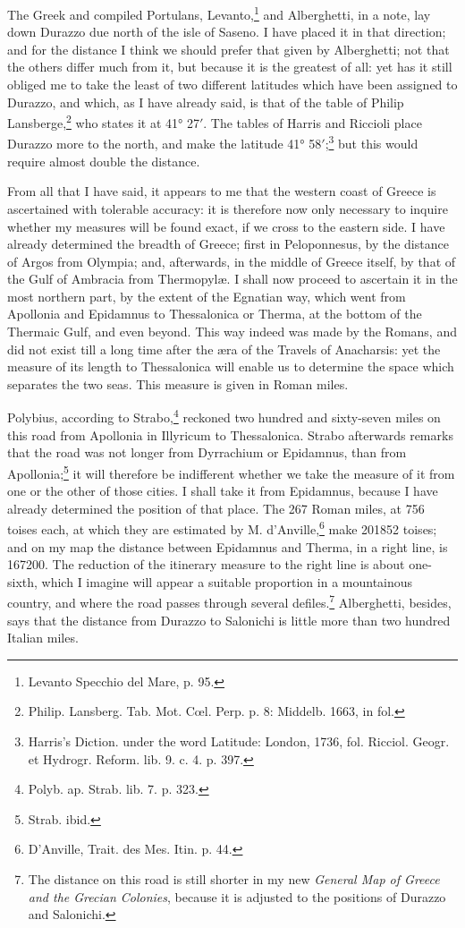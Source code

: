 \documentclass[a4paper, 11pt, oneside, polutonikogreek, english]{article}
\begin{document}
The Greek and compiled Portulans, Levanto,\footnote{Levanto Specchio del Mare, p. 95.} and Alberghetti, in a note, lay down Durazzo due north of the isle of Saseno. I have placed it in that direction; and for the distance I think we should prefer that given by Alberghetti; not that the others differ much from it, but because it is the greatest of all: yet has it still obliged me to take the least of two different latitudes which have been assigned to Durazzo, and which, as I have already said, is that of the table of Philip Lansberge,\footnote{Philip. Lansberg. Tab. Mot. Cœl. Perp. p. 8: Middelb. 1663, in fol.} who states it at 41° 27$'$. The tables of Harris and Riccioli place Durazzo more to the north, and make the latitude 41° 58$'$;\footnote{Harris's Diction. under the word Latitude: London, 1736, fol. Ricciol. Geogr. et Hydrogr. Reform. lib. 9. c. 4. p. 397.} but this would require almost double the distance.

From all that I have said, it appears to me that the western coast of Greece is ascertained with tolerable accuracy: it is therefore now only necessary to inquire whether my measures will be found exact, if we cross to the eastern side. I have already determined the breadth of Greece; first in Peloponnesus, by the distance of Argos from Olympia; and, afterwards, in the middle of Greece itself, by that of the Gulf of Ambracia from Thermopylæ. I shall now proceed to ascertain it in the most northern part, by the extent of the Egnatian way, which went from Apollonia and Epidamnus to Thessalonica or Therma, at the bottom of the Thermaic Gulf, and even beyond. This way indeed was made by the Romans, and did not exist till a long time after the æra of the Travels of Anacharsis: yet the measure of its length to Thessalonica will enable us to determine the space which separates the two seas. This measure is given in Roman miles.

Polybius, according to Strabo,\footnote{Polyb. ap. Strab. lib. 7. p. 323.} reckoned two hundred and sixty-seven miles on this road from Apollonia in Illyricum to Thessalonica. Strabo afterwards remarks that the road was not longer from Dyrrachium or Epidamnus, than from Apollonia;\footnote{Strab. ibid.} it will therefore be indifferent whether we take the measure of it from one or the other of those cities. I shall take it from Epidamnus, because I have already determined the position of that place. The 267 Roman miles, at 756 toises each, at which they are estimated by M. d'Anville,\footnote{D'Anville, Trait. des Mes. Itin. p. 44.} make 201852 toises; and on my map the distance between Epidamnus and Therma, in a right line, is 167200. The reduction of the itinerary measure to the right line is about one-sixth, which I imagine will appear a suitable proportion in a mountainous country, and where the road passes through several defiles.\footnote{The distance on this road is still shorter in my new \emph{General Map of Greece and the Grecian Colonies}, because it is adjusted to the positions of Durazzo and Salonichi.} Alberghetti, besides, says that the distance from Durazzo to Salonichi is little more than two hundred Italian miles.
\end{document}
